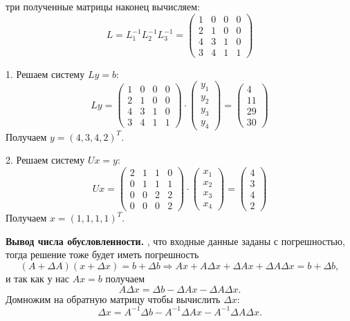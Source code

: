 \documentclass[9pt]{article}
\begin{document}
 три полученные матрицы наконец вычисляем:
\[L=L_1^{-1}L_2^{-1}L_3^{-1}=\left(
\begin{array}{cccc}
    1 & 0 & 0 & 0\\
    2 & 1 & 0 & 0\\
    4 & 3 & 1 & 0\\
    3 & 4 & 1 & 1
\end{array}
\right)\]
\par1. Решаем систему \(Ly=b\):
\[Ly=\left(
\begin{array}{cccc}
    1 & 0 & 0 & 0\\
    2 & 1 & 0 & 0\\
    4 & 3 & 1 & 0\\
    3 & 4 & 1 & 1
\end{array}
\right)\cdot\left(
\begin{array}{c}
    y_1\\
    y_2\\
    y_3\\
    y_4
\end{array}
\right)=\left(
\begin{array}{c}
    4\\
    11\\
    29\\
    30
\end{array}
\right)\]
Получаем \(y=(4, 3, 4, 2)^T\).
\par2. Решаем систему \(Ux=y\):
\[Ux=\left(
\begin{array}{cccc}
    2 & 1 & 1 & 0\\
    0 & 1 & 1 & 1\\
    0 & 0 & 2 & 2\\
    0 & 0 & 0 & 2
\end{array}
\right)\cdot\left(
\begin{array}{c}
    x_1\\
    x_2\\
    x_3\\
    x_4
\end{array}
\right)=\left(
\begin{array}{c}
    4\\
    3\\
    4\\
    2
\end{array}
\right)\]
Получаем \(x=(1,1,1,1)^T\).
\par\textbf{Вывод числа обусловленности.}
, что входные данные заданы с погрешностью, тогда решение тоже будет иметь погрешность  \[(A+\Delta A)(x+\Delta x)=b+\Delta b\Rightarrow Ax+A\Delta x + \Delta Ax+\Delta A\Delta x=b+\Delta b,\] и так как у нас \(Ax=b\) получаем\[A\Delta x=\Delta b-\Delta Ax-\Delta A\Delta x.\]Домножим на обратную матрицу чтобы вычислить \(\Delta x\): \[\Delta x = A^{-1}\Delta b-A^{-1}\Delta Ax-A^{-1}\Delta A\Delta x.\]
\end{document}
